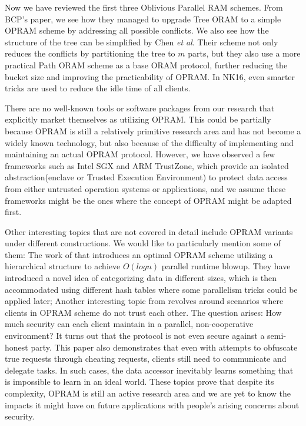 \documentclass[fontsize=11pt]{article}
\begin{document}
Now we have reviewed the first three Oblivious Parallel RAM schemes. 
From BCP's paper, we see how they managed to upgrade Tree ORAM to a simple OPRAM scheme by addressing all possible conflicts. We also see how the structure of the tree can be simplified by Chen \textit{et al}. Their scheme not only reduces the conflicts by partitioning the tree to $m$ parts, but they also use a more practical Path ORAM scheme as a base ORAM protocol, further reducing the bucket size and improving the practicability of OPRAM. In NK16, even smarter tricks are used to reduce the idle time of all clients. 

There are no well-known tools or software packages from our research that explicitly market themselves as utilizing OPRAM. This could be partially because OPRAM is still a relatively primitive research area and has not become a widely known technology, but also because of the difficulty of implementing and maintaining an actual OPRAM protocol. However, we have observed a few frameworks such as Intel SGX and ARM TrustZone, which provide an isolated abstraction(enclave or Trusted Execution Environment) to protect data access from either untrusted operation systems or applications, and we assume these frameworks might be the ones where the concept of OPRAM might be adapted first.


Other interesting topics that are not covered in detail include OPRAM variants under different constructions. We would like to particularly mention some of them: The work of \cite{OptOPRAM20} that introduces an optimal OPRAM scheme utilizing a hierarchical structure to achieve $O(logn)$ parallel runtime blowup. They have introduced a novel idea of categorizing data in different sizes, which is then accommodated using different hash tables where some parallelism tricks could be applied later; Another interesting topic from \cite{DJM20} revolves around scenarios where clients in OPRAM scheme do not trust each other. The question arises: How much security can each client maintain in a parallel, non-cooperative environment? It turns out that the protocol is not even secure against a semi-honest party. This paper also demonstrates that even with attempts to obfuscate true requests through cheating requests, clients still need to communicate and delegate tasks. In such cases, the data accessor inevitably learns something that is impossible to learn in an ideal world. These topics prove that despite its complexity, OPRAM is still an active research area and we are yet to know the impacts it might have on future applications with people's arising concerns about security.



\newpage


\end{document}
